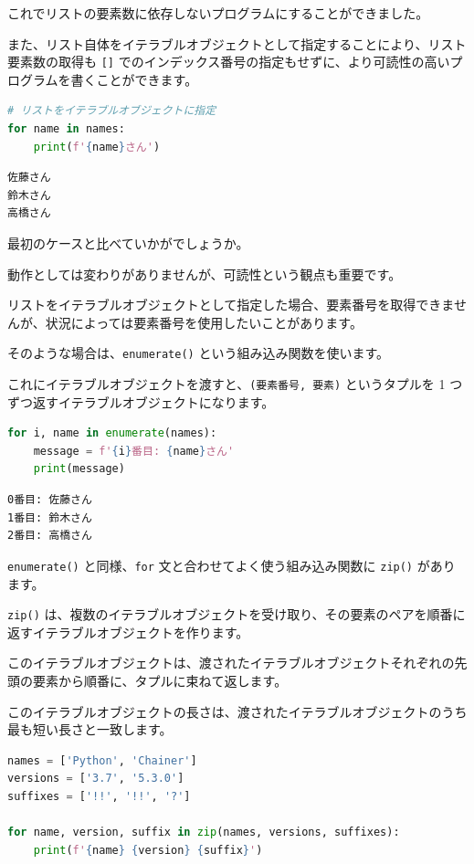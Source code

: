これでリストの要素数に依存しないプログラムにすることができました。


また、リスト自体をイテラブルオブジェクトとして指定することにより、リスト要素数の取得も \texttt{[]} でのインデックス番号の指定もせずに、より可読性の高いプログラムを書くことができます。


\begin{lstlisting}[style=codecell,language=Python]
# リストをイテラブルオブジェクトに指定
for name in names:
    print(f'{name}さん')
\end{lstlisting}

\begin{lstlisting}[style=outputcell]
佐藤さん
鈴木さん
高橋さん
\end{lstlisting}

最初のケースと比べていかがでしょうか。

動作としては変わりがありませんが、可読性という観点も重要です。


リストをイテラブルオブジェクトとして指定した場合、要素番号を取得できませんが、状況によっては要素番号を使用したいことがあります。


そのような場合は、\texttt{enumerate()} という組み込み関数を使います。

これにイテラブルオブジェクトを渡すと、\texttt{(要素番号, 要素)} というタプルを 1 つずつ返すイテラブルオブジェクトになります。


\begin{lstlisting}[style=codecell,language=Python]
for i, name in enumerate(names):
    message = f'{i}番目: {name}さん'
    print(message)
\end{lstlisting}

\begin{lstlisting}[style=outputcell]
0番目: 佐藤さん
1番目: 鈴木さん
2番目: 高橋さん
\end{lstlisting}

\texttt{enumerate()} と同様、\texttt{for} 文と合わせてよく使う組み込み関数に \texttt{zip()} があります。


\texttt{zip()} は、複数のイテラブルオブジェクトを受け取り、その要素のペアを順番に返すイテラブルオブジェクトを作ります。

このイテラブルオブジェクトは、渡されたイテラブルオブジェクトそれぞれの先頭の要素から順番に、タプルに束ねて返します。

このイテラブルオブジェクトの長さは、渡されたイテラブルオブジェクトのうち最も短い長さと一致します。


\begin{lstlisting}[style=codecell,language=Python]
names = ['Python', 'Chainer']
versions = ['3.7', '5.3.0']
suffixes = ['!!', '!!', '?']

for name, version, suffix in zip(names, versions, suffixes):
    print(f'{name} {version} {suffix}')
\end{lstlisting}

